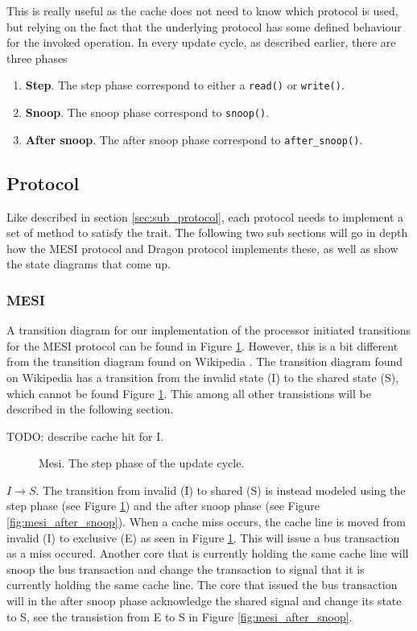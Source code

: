This is really useful as the cache does not need to know which protocol is used, but relying on the fact that the underlying protocol has some defined behaviour for the invoked operation.
In every update cycle, as described earlier, there are three phases

\begin{enumerate}
    \item \textbf{Step}. The step phase correspond to either a \texttt{read()} or \texttt{write()}.
    \item \textbf{Snoop}. The snoop phase correspond to \texttt{snoop()}.
    \item \textbf{After snoop}. The after snoop phase correspond to \texttt{after\_snoop()}.
\end{enumerate}

\subsection{Protocol}
Like described in section \ref{sec:sub_protocol}, each protocol needs to implement a set of method
to satisfy the trait.  The following two sub sections will go in depth how the MESI protocol and
Dragon protocol implements these, as well as show the state diagrams that come up.

\subsubsection{MESI}

A transition diagram for our implementation of the processor initiated transitions for the MESI protocol can be found in Figure \ref{fig:mesi}.
However, this is a bit different from the transition diagram found on Wikipedia \cite{mesi_wiki}.
The transition diagram found on Wikipedia has a transition from the invalid state (I) to the shared state (S), which cannot be found Figure \ref{fig:mesi}.
This among all other transistions will be described in the following section.

TODO: describe cache hit for I. 


\begin{figure}[H]
    \centering
    \caption{Mesi. The step phase of the update cycle.}
    \label{fig:mesi}
\end{figure}

$I \to S$. The transition from invalid (I) to shared (S) is instead modeled using the step phase (see Figure \ref{fig:mesi}) and the after snoop phase (see Figure \ref{fig:mesi_after_snoop}).
When a cache miss occurs, the cache line is moved from invalid (I) to exclusive (E) as seen in Figure \ref{fig:mesi}.
This will issue a bus transaction as a miss occured.
Another core that is currently holding the same cache line will snoop the bus transaction and change the transaction to signal that it is currently holding the same cache line.
The core that issued the bus transaction will in the after snoop phase acknowledge the shared signal and change its state to S, see the transistion from E to S in Figure \ref{fig:mesi_after_snoop}.

